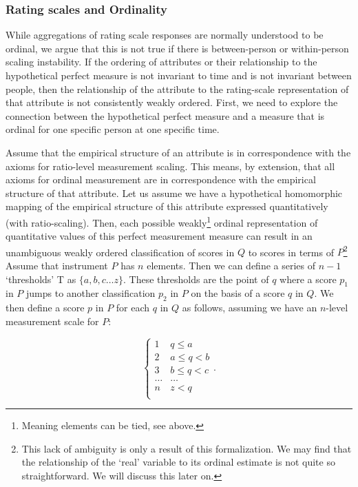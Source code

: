 \documentclass[utf8]{FrontiersinVancouver}
\begin{document}
\subsubsection{Rating scales and Ordinality}
While aggregations of rating scale responses are normally understood to be ordinal, we argue that this is not true if there is between-person or within-person scaling instability. If the ordering of attributes or their relationship to the hypothetical perfect measure is not invariant to time and is not invariant between people, then the relationship of the attribute to the rating-scale representation of that attribute is not consistently weakly ordered. First, we need to explore the connection between the hypothetical perfect measure and a measure that is ordinal for one specific person at one specific time.

Assume that the empirical structure of an attribute is in correspondence with the axioms for ratio-level measurement scaling. This means, by extension, that all axioms for ordinal measurement are in correspondence with the empirical structure of that attribute. Let us assume we have a hypothetical homomorphic mapping of the empirical structure of this attribute expressed quantitatively (with ratio-scaling). Then, each possible weakly\footnote{Meaning elements can be tied, see above.} ordinal representation of quantitative values of this perfect measurement measure can result in an unambiguous weakly ordered classification of scores in $Q$ to scores in terms of $P$\footnote{This lack of ambiguity is only a result of this formalization. We may find that the relationship of the `real' variable to its ordinal estimate is not quite so straightforward. We will discuss this later on.} Assume that instrument $P$ has $n$ elements. Then we can define a series of $n - 1$ `thresholds' T as $\{ a, b, c \ldots z \}$. These thresholds are the point of $q$ where a score $p_1$ in $P$ jumps to another classification $p_2$ in $P$ on the basis of a score $q$ in $Q$. We then define a score $p$ in $P$ for each $q$ in $Q$ as follows, assuming we have an $n$-level measurement scale for $P$:

\[
\begin{cases} 
    1 & q \leq a\\
    2 & a \leq q < b\\
    3 & b \leq q < c\\
    \ldots & \ldots\\    
    n & z < q\\
\end{cases}.
\]
\end{document}
